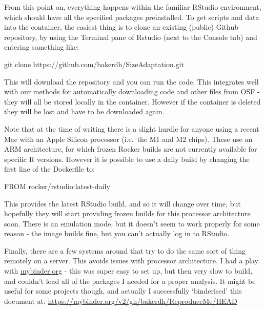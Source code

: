 \documentclass[
]{article}
\newenvironment{Shaded}{\begin{snugshade}}{\end{snugshade}}
\newcommand{\ExtensionTok}[1]{#1}
\newcommand{\FunctionTok}[1]{\textcolor[rgb]{0.00,0.00,0.00}{#1}}
\newcommand{\NormalTok}[1]{#1}
\begin{document}
From this point on, everything happens within the familiar RStudio environment, which should have all the specified packages preinstalled. To get scripts and data into the container, the easiest thing is to clone an existing (public) Github repository, by using the Terminal pane of Rstudio (next to the Console tab) and entering something like:

\begin{Shaded}
\begin{Highlighting}[]

\FunctionTok{git}\NormalTok{ clone https://github.com/bakerdh/SizeAdaptation.git}
\end{Highlighting}
\end{Shaded}

This will download the repository and you can run the code. This integrates well with our methods for automatically downloading code and other files from OSF - they will all be stored locally in the container. However if the container is deleted they will be lost and have to be downloaded again.

Note that at the time of writing there is a slight hurdle for anyone using a recent Mac with an Apple Silicon processor (i.e.~the M1 and M2 chips). These use an ARM architecture, for which frozen Rocker builds are not currently available for specific R versions. However it is possible to use a daily build by changing the first line of the Dockerfile to:

\begin{Shaded}
\begin{Highlighting}[]

\ExtensionTok{FROM}\NormalTok{ rocker/rstudio:latest{-}daily}
\end{Highlighting}
\end{Shaded}

This provides the latest RStudio build, and so it will change over time, but hopefully they will start providing frozen builds for this processor architecture soon. There is an emulation mode, but it doesn't seem to work properly for some reason - the image builds fine, but you can't actually log in to RStudio.

Finally, there are a few systems around that try to do the same sort of thing remotely on a server. This avoids issues with processor architecture. I had a play with \href{https://mybinder.org}{mybinder.org} - this was super easy to set up, but then very slow to build, and couldn't load all of the packages I needed for a proper analysis. It might be useful for some projects though, and actually I successfully `binderised' this document at: \url{https://mybinder.org/v2/gh/bakerdh/ReproduceMe/HEAD}
\end{document}
